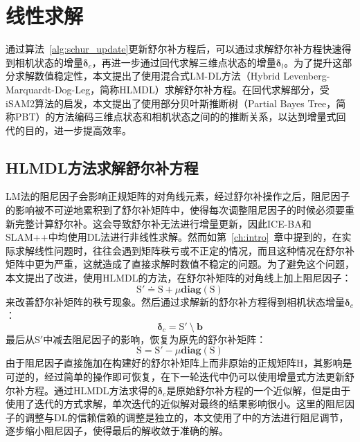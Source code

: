 \section{线性求解}\label{sec:lin_solver}

通过算法~\ref{alg:schur_update}更新舒尔补方程后，可以通过求解舒尔补方程快速得到相机状态的增量$\bm{\delta}_c$，再进一步通过回代求解三维点状态的增量$\bm{\delta}_l$。为了提升这部分求解数值稳定性，本文提出了使用混合式LM-DL方法（Hybrid Levenberg-Marquardt-Dog-Leg，简称HLMDL）求解舒尔补方程。在回代求解部分，受iSAM2\citep{kaess2012isam2}算法的启发，本文提出了使用部分贝叶斯推断树（Partial Bayes Tree，简称PBT）的方法编码三维点状态和相机状态之间的的推断关系，以达到增量式回代的目的，进一步提高效率。

\subsection{HLMDL方法求解舒尔补方程}

LM法的阻尼因子会影响正规矩阵的对角线元素，经过舒尔补操作之后，阻尼因子的影响被不可逆地累积到了舒尔补矩阵中，使得每次调整阻尼因子的时候必须要重新完整计算舒尔补。这会导致舒尔补无法进行增量更新，因此ICE-BA\citep{liu2018ice}和SLAM++中均使用DL法进行非线性求解。然而如第~\ref{ch:intro}~章中提到的，在实际求解线性问题时，往往会遇到矩阵秩亏或不正定的情况，而且这种情况在舒尔补矩阵中更为严重，这就造成了直接求解时数值不稳定的问题。为了避免这个问题，本文提出了改进，使用HLMDL的方法，在舒尔补矩阵的对角线上加上阻尼因子：
\begin{equation}
    \mathrm{S}' \doteq \mathrm{S}+\mu\mathbf{diag}(\mathrm{S})
\end{equation}
来改善舒尔补矩阵的秩亏现象。然后通过求解新的舒尔补方程得到相机状态增量$\bm{\delta}_c$：
\begin{equation}
    \bm{\delta}_c = \mathrm{S}' \:\setminus\: \bm{b}
    \label{eq:hlmdl}
\end{equation}
最后从$\mathrm{S}'$中减去阻尼因子的影响，恢复为原先的舒尔补矩阵：
\begin{equation}
    \mathrm{S} = \mathrm{S}'-\mu\mathbf{diag}(\mathrm{S})
\end{equation}
由于阻尼因子直接施加在构建好的舒尔补矩阵上而非原始的正规矩阵$\mathrm{H}$，其影响是可逆的，经过简单的操作即可恢复，在下一轮迭代中仍可以使用增量式方法更新舒尔补方程。通过HLMDL方法求得的$\bm{\delta}_c$是原始舒尔补方程的一个近似解，但是由于使用了迭代的方式求解，单次迭代的近似解对最终的结果影响很小。这里的阻尼因子的调整与DL的信赖信赖的调整是独立的，本文使用了中的方法进行阻尼调节，逐步缩小阻尼因子，使得最后的解收敛于准确的解。

